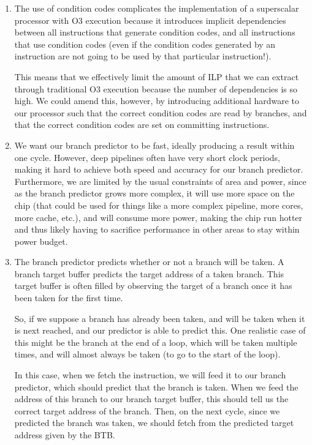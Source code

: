 


\begin{enumerate}[label=(\alph*)]
  \item
  The use of condition codes complicates the implementation of a superscalar processor with O3 execution because it introduces implicit dependencies between all instructions that generate condition codes, and all instructions that use condition codes (even if the condition codes generated by an instruction are not going to be used by that particular instruction!).

  This means that we effectively limit the amount of ILP that we can extract through traditional O3 execution because the number of dependencies is so high. We could amend this, however, by introducing additional hardware to our processor such that the correct condition codes are read by branches, and that the correct condition codes are set on committing instructions.

\item
  We want our branch predictor to be fast, ideally producing a result within one cycle. However, deep pipelines often have very short clock periods, making it hard to achieve both speed and accuracy for our branch predictor. Furthermore, we are limited by the usual constraints of area and power, since as the branch predictor grows more complex, it will use more space on the chip (that could be used for things like a more complex pipeline, more cores, more cache, etc.), and will consume more power, making the chip run hotter and thus likely having to sacrifice performance in other areas to stay within power budget.

\item
  The branch predictor predicts whether or not a branch will be taken. A branch target buffer predicts the target address of a taken branch. This target buffer is often filled by observing the target of a branch once it has been taken for the first time.

  So, if we suppose a branch has already been taken, and will be taken when it is next reached, and our predictor is able to predict this. One realistic case of this might be the branch at the end of a loop, which will be taken multiple times, and will almost always be taken (to go to the start of the loop).

  In this case, when we fetch the instruction, we will feed it to our branch predictor, which should predict that the branch is taken. When we feed the address of this branch to our branch target buffer, this should tell us the correct target address of the branch. Then, on the next cycle, since we predicted the branch was taken, we should fetch from the predicted target address given by the BTB.


\end{enumerate}
